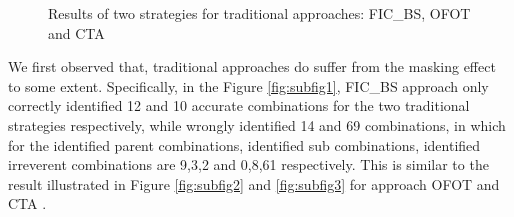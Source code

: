 \documentclass{sig-alternate}
\begin{document}
\begin{figure}[ht]
\centering
{}
\caption[]{Results of two strategies for traditional approaches: FIC\_BS, OFOT and CTA}
\label{fig:normalexperiment}
\end{figure}

We first observed that, traditional approaches do suffer from the masking effect to some extent. Specifically, in the Figure \ref{fig:subfig1}, FIC\_BS approach only correctly identified 12 and 10 accurate combinations for the two traditional strategies respectively, while wrongly identified 14 and 69 combinations, in which for the identified parent combinations, identified sub combinations, identified irreverent combinations are 9,3,2 and 0,8,61 respectively. This is similar to the result illustrated in Figure \ref{fig:subfig2} and \ref{fig:subfig3} for approach OFOT and CTA .
\end{document}
